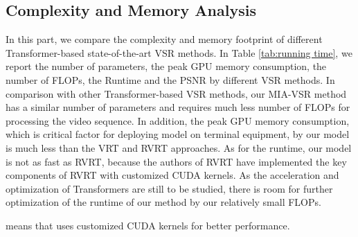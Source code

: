 \documentclass[10pt,twocolumn,letterpaper]{article}
\begin{document}
\subsection{Complexity and Memory Analysis}
In this part, we compare the complexity and memory footprint of different Transformer-based state-of-the-art VSR methods.
%
In Table \ref{tab:running time}, we report the number of parameters, the peak GPU memory consumption, the number of FLOPs, the Runtime and the PSNR by different VSR methods.
%
In comparison with other Transformer-based VSR methods, our MIA-VSR method has a similar number of parameters and requires much less number of FLOPs for processing the video sequence.
%
In addition, the peak GPU memory consumption, which is critical factor for deploying model on terminal equipment, by our model is much less than the VRT and RVRT approaches.
%
As for the runtime, our model is not as fast as RVRT, because the authors of RVRT have implemented the key components of RVRT with customized CUDA kernels.
%
As the acceleration and optimization of
Transformers are still to be studied, there is room for further optimization of the runtime of our method by our relatively small FLOPs.
%
\begin{table}
    \caption{Comparison of model size, testing memory and complexity of different VSR models on the  REDS\cite{nah2019ntire} dataset.}    \label{tab:running time}
    \renewcommand{\arraystretch}{1.2}
	\renewcommand{\tabcolsep}{2.5pt}
    \label{results-table}
    \begin{threeparttable}
    \begin{adjustbox}{center}  
    \centering
  \end{adjustbox}
  \begin{tablenotes} %
	\footnotesize \item * means that uses customized CUDA kernels for better performance.
    \end{tablenotes}%
  \end{threeparttable}
\end{table}
\end{document}
